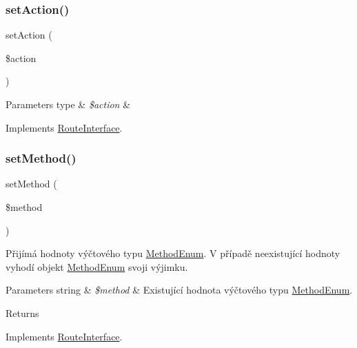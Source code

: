 \subsubsection{\texorpdfstring{set\+Action()}{setAction()}}
{\footnotesize\ttfamily set\+Action (\begin{DoxyParamCaption}\item[{}]{\$action }\end{DoxyParamCaption})}


\begin{DoxyParams}[1]{Parameters}
type & {\em \$action} & \\
\hline
\end{DoxyParams}


Implements \mbox{\hyperlink{interface_pes_1_1_router_1_1_route_interface_a0366b3b0db0bd90abfc461c372f86599}{Route\+Interface}}.

\mbox{\label{class_pes_1_1_router_1_1_route_a643c65610f8b3179a8c147cab7cbb652}} 
\subsubsection{\texorpdfstring{set\+Method()}{setMethod()}}
{\footnotesize\ttfamily set\+Method (\begin{DoxyParamCaption}\item[{}]{\$method }\end{DoxyParamCaption})}

Přijímá hodnoty výčtového typu \mbox{\hyperlink{class_pes_1_1_router_1_1_method_enum}{Method\+Enum}}. V případě neexistující hodnoty vyhodí objekt \mbox{\hyperlink{class_pes_1_1_router_1_1_method_enum}{Method\+Enum}} svoji výjimku.


\begin{DoxyParams}[1]{Parameters}
string & {\em \$method} & Existující hodnota výčtového typu \mbox{\hyperlink{class_pes_1_1_router_1_1_method_enum}{Method\+Enum}}. \\
\hline
\end{DoxyParams}
\begin{DoxyReturn}{Returns}

\end{DoxyReturn}


Implements \mbox{\hyperlink{interface_pes_1_1_router_1_1_route_interface_a643c65610f8b3179a8c147cab7cbb652}{Route\+Interface}}.

